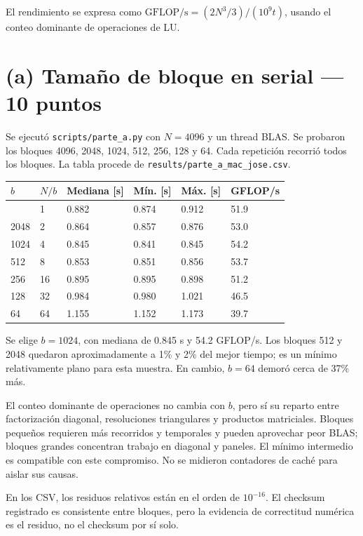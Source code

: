 \documentclass[
  spanish,
  11pt,
  a4paper,
]{article}
\newcounter{none} %
\begin{document}
El rendimiento se expresa como \(\mathrm{GFLOP/s}=(2N^3/3)/(10^9t)\),
usando el conteo dominante de operaciones de LU.

\section{(a) Tamaño de bloque en serial --- 10
puntos}\label{a-tamauxf1o-de-bloque-en-serial-10-puntos}

Se ejecutó \texttt{scripts/parte\_a.py} con \(N=4096\) y un thread BLAS.
Se probaron los bloques 4096, 2048, 1024, 512, 256, 128 y 64. Cada
repetición recorrió todos los bloques. La tabla procede de
\texttt{results/parte\_a\_mac\_jose.csv}.

{\def\LTcaptype{none} %
\begin{longtable}[]{@{}llllll@{}}
\toprule\noalign{}
\(b\) & \(N/b\) & Mediana {[}s{]} & Mín. {[}s{]} & Máx. {[}s{]} &
GFLOP/s \\
\midrule\noalign{}
\endhead
\bottomrule\noalign{}
\endlastfoot
4096 & 1 & 0.882 & 0.874 & 0.912 & 51.9 \\
2048 & 2 & 0.864 & 0.857 & 0.876 & 53.0 \\
1024 & 4 & 0.845 & 0.841 & 0.845 & 54.2 \\
512 & 8 & 0.853 & 0.851 & 0.856 & 53.7 \\
256 & 16 & 0.895 & 0.895 & 0.898 & 51.2 \\
128 & 32 & 0.984 & 0.980 & 1.021 & 46.5 \\
64 & 64 & 1.155 & 1.152 & 1.173 & 39.7 \\
\end{longtable}
}

Se elige \textbf{\(b=1024\)}, con mediana de 0.845 s y 54.2 GFLOP/s. Los
bloques 512 y 2048 quedaron aproximadamente a 1\% y 2\% del mejor
tiempo; es un mínimo relativamente plano para esta muestra. En cambio,
\(b=64\) demoró cerca de 37\% más.

El conteo dominante de operaciones no cambia con \(b\), pero sí su
reparto entre factorización diagonal, resoluciones triangulares y
productos matriciales. Bloques pequeños requieren más recorridos y
temporales y pueden aprovechar peor BLAS; bloques grandes concentran
trabajo en diagonal y paneles. El mínimo intermedio es compatible con
este compromiso. No se midieron contadores de caché para aislar sus
causas.

En los CSV, los residuos relativos están en el orden de \(10^{-16}\). El
checksum registrado es consistente entre bloques, pero la evidencia de
correctitud numérica es el residuo, no el checksum por sí solo.
\end{document}
